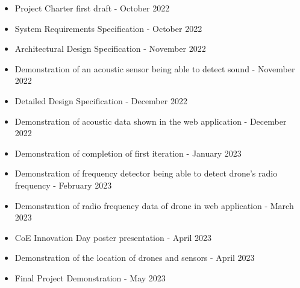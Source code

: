\begin{itemize}
  \item Project Charter first draft - October 2022
  \item System Requirements Specification - October 2022
  \item Architectural Design Specification - November 2022
  \item Demonstration of an acoustic sensor being able to detect sound - November 2022
  \item Detailed Design Specification - December 2022
  \item Demonstration of acoustic data shown in the web application - December 2022
  \item Demonstration of completion of first iteration - January 2023
  \item Demonstration of frequency detector being able to detect drone's radio frequency - February 2023
  \item Demonstration of radio frequency data of drone in web application - March 2023
  \item CoE Innovation Day poster presentation - April 2023
  \item Demonstration of the location of drones and sensors - April 2023
  \item Final Project Demonstration - May 2023
\end{itemize}
